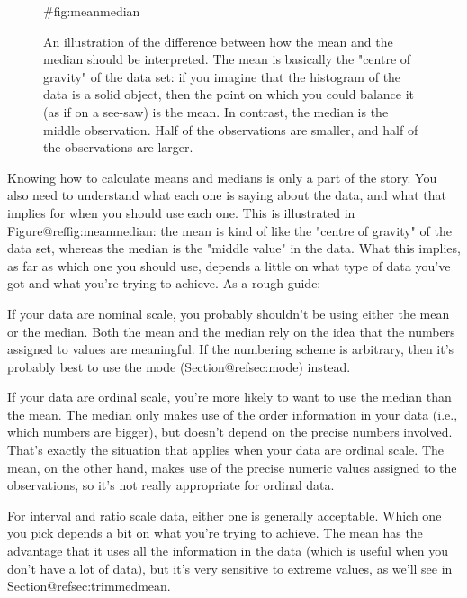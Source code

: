\begin{figure}
\begin{center}
\caption{An illustration of the difference between how the mean and the median should be interpreted. The mean is basically the "centre of gravity" of the data set: if you imagine that the histogram of the data is a solid object, then the point on which you could balance it (as if on a see-saw) is the mean. In contrast, the median is the middle observation. Half of the observations are smaller, and half of the observations are larger.}
\HR
{#fig:meanmedian}
\end{center}
\end{figure}

Knowing how to calculate means and medians is only a part of the story. You also need to understand what each one is saying about the data, and what that implies for when you should use each one. This is illustrated in Figure@reffig:meanmedian: the mean is kind of like the "centre of gravity" of the data set, whereas the median is the "middle value" in the data. What this implies, as far as which one you should use, depends a little on what type of data you've got and what you're trying to achieve. As a rough guide:
 
\item If your data are nominal scale, you probably shouldn't be using either the mean or the median. Both the mean and the median rely on the idea that the numbers assigned to values are meaningful. If the numbering scheme is arbitrary, then it's probably best to use the mode (Section@refsec:mode) instead. 
\item If your data are ordinal scale, you're more likely to want to use the median than the mean. The median only makes use of the order information in your data (i.e., which numbers are bigger), but doesn't depend on the precise numbers involved. That's exactly the situation that applies when your data are ordinal scale. The mean, on the other hand, makes use of the precise numeric values assigned to the observations, so it's not really appropriate for ordinal data.
\item For interval and ratio scale data, either one is generally acceptable. Which one you pick depends a bit on what you're trying to achieve. The mean has the advantage that it uses all the information in the data (which is useful when you don't have a lot of data), but it's very sensitive to extreme values, as we'll see in Section@refsec:trimmedmean.  


